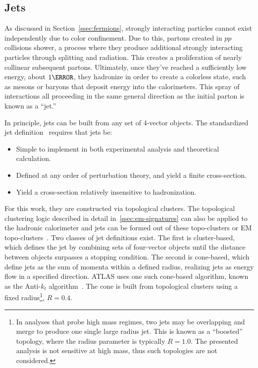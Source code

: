 \subsection{Jets}\label{ssec:jet-reco}
As discussed in Section~\ref{ssec:fermions}, strongly interacting particles cannot exist independently due to color confinement. Due to this, partons created in $pp$ collisions shower, a process where they produce additional strongly interacting particles through splitting and radiation. This creates a proliferation of nearly collinear subsequent partons. Ultimately, once they've reached a sufficiently low energy, about $\unit{1}{\GeV}$, they hadronize in order to create a colorless state, such as mesons or baryons that deposit energy into the calorimeters. This spray of interactions all proceeding in the same general direction as the initial parton is known as a ``jet.''

In principle, jets can be built from any set of 4-vector objects. The standardized jet definition~\cite{jet-standardization} requires that jets be:
\begin{itemize}
    \item Simple to implement in both experimental analysis and theoretical calculation.
    \item Defined at any order of perturbation theory, and yield a finite cross-section.
    \item Yield a cross-section relatively insensitive to hadronization.
\end{itemize}

For this work, they are constructed via topological clusters. The topological clustering logic described in detail in~\ref{ssec:em-signatures} can also be applied to the hadronic calorimeter and jets can be formed out of these topo-clusters or \gls{EM} topo-clusters~\cite{topo-cluster}. Two classes of jet definitions exist. The first is cluster-based, which defines the jet by combining sets of four-vector objects until the distance between objects surpasses a stopping condition. The second is cone-based, which define jets as the sum of momenta within a defined radius, realizing jets as energy flow in a specified direction. ATLAS uses one such cone-based algorithm, known as the Anti-$k_t$ algorithm~\cite{anti-kt}. The cone is built from topological clusters using a fixed radius\footnote{In analyses that probe high mass regimes, two jets may be overlapping and merge to produce one single large radius jet. This is known as a ``boosted'' topology, where the radius parameter is typically $R=1.0$. The presented analysis is not sensitive at high mass, thus such topologies are not considered.}, $R=0.4$.


